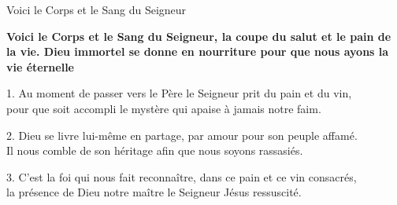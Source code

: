 Voici le Corps et le Sang du Seigneur

\textbf{Voici le Corps et le Sang du Seigneur, la coupe du salut et le pain de la vie. Dieu immortel se donne en nourriture pour que nous ayons la vie éternelle}

1. Au moment de passer vers le Père le Seigneur prit du pain et du vin,\\
pour que soit accompli le mystère qui apaise à jamais notre faim.

2. Dieu se livre lui-même en partage, par amour pour son peuple affamé.\\
Il nous comble de son héritage afin que nous soyons rassasiés.

3. C'est la foi qui nous fait reconnaître, dans ce pain et ce vin consacrés,\\
la présence de Dieu notre maître le Seigneur Jésus ressuscité.

